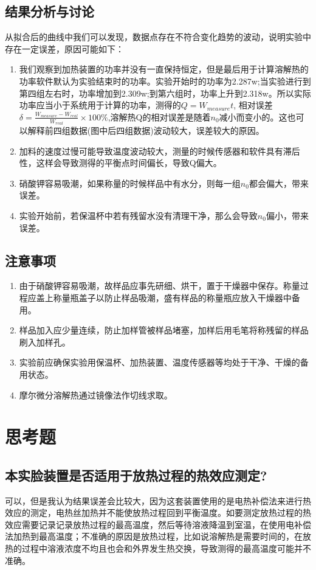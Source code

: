 \documentclass[UTF8]{ctexart}
\begin{document}
\subsection{结果分析与讨论}
从拟合后的曲线中我们可以发现，数据点存在不符合变化趋势的波动，说明实验中存在一定误差，原因可能如下：
\begin{enumerate}
    \item 我们观察到加热装置的功率并没有一直保持恒定，但是最后用于计算溶解热的功率软件默认为实验结束时的功率。实验开始时的功率为2.287w;当实验进行到第四组左右时，功率增加到2.309w;到第六组时，功率上升到2.318w。所以实际功率应当小于系统用于计算的功率，测得的$Q=W_{measure}t$, 相对误差$\delta = \frac{W_{measure}-W_{real}}{W_{real}} \times 100 \% $,溶解热Q的相对误差是随着$n_0$减小而变小的。这也可以解释前四组数据(图中后四组数据)波动较大，误差较大的原因。
    \item 加料的速度过慢可能导致温度波动较大，测量的时候传感器和软件具有滞后性，这样会导致测得的平衡点时间偏长，导致Q偏大。
    \item 硝酸钾容易吸潮，如果称量的时候样品中有水分，则每一组$n_0$都会偏大，带来误差。
    \item 实验开始前，若保温杯中若有残留水没有清理干净，那么会导致$n_0$偏小，带来误差。
\end{enumerate}

\subsection{注意事项}
\begin{enumerate}
    \item 由于硝酸钾容易吸潮，故样品应事先研细、烘干，置于干燥器中保存。称量过程应盖上称量瓶盖子以防止样品吸潮，盛有样品的称量瓶应放入干燥器中备用。
    \item 样品加入应少量连续，防止加样管被样品堵塞，加样后用毛笔将称残留的样品刷入加样孔。
    \item 实验前应确保实验用保温杯、加热装置、温度传感器等均处于干净、干燥的备用状态。
    \item 摩尔微分溶解热通过镜像法作切线求取。
\end{enumerate}


\section{思考题}
\subsection{本实脸装置是否适用于放热过程的热效应测定?}
可以，但是我认为结果误差会比较大，因为这套装置使用的是电热补偿法来进行热效应的测定，电热丝加热并不能使放热过程回到平衡温度。如要测定放热过程的热效应需要记录记录放热过程的最高温度，然后等待溶液降温到室温，在使用电补偿法加热到最高温度；不准确的原因是放热过程，比如说溶解热是需要时间的，在放热的过程中溶液浓度不均且也会和外界发生热交换，导致测得的最高温度可能并不准确。
\end{document}
